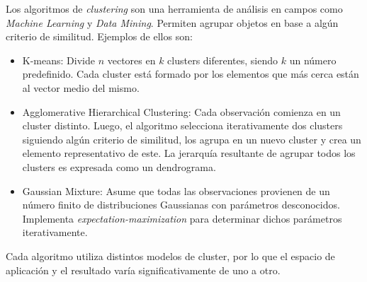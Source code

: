 \vspace{0.3cm}

Los algoritmos de \textit{clustering} son una herramienta de an\'alisis en campos
como \textit{Machine Learning} y \textit{Data Mining}. Permiten agrupar objetos
en base a alg\'un criterio de similitud. Ejemplos de ellos son: 

\begin{itemize}
    \item K-means: Divide $n$ vectores en $k$ clusters diferentes, siendo $k$
                   un n\'umero predefinido. Cada cluster est\'a formado 
                   por los elementos que m\'as cerca est\'an al vector medio del
                   mismo. \cite{Hartigan1979}
    \item Agglomerative Hierarchical Clustering: Cada observaci\'on comienza en 
                   un cluster distinto. Luego, el algoritmo selecciona iterativamente
                   dos clusters siguiendo alg\'un criterio de similitud, los agrupa
                   en un nuevo cluster y crea un elemento representativo de este.
                   La jerarqu\'ia resultante de agrupar todos los clusters
                   es expresada como un dendrograma. \cite{Mining2009}
    \item Gaussian Mixture: Asume que todas las observaciones provienen de un 
                   n\'umero finito de distribuciones Gaussianas con par\'ametros
                   desconocidos. Implementa \textit{expectation-maximization} para
                   determinar dichos par\'ametros iterativamente. \cite{Mining2009}
\end{itemize}

Cada algoritmo utiliza distintos modelos de cluster, por lo que el espacio de
aplicaci\'on y el resultado var\'ia significativamente de uno a otro. \\

